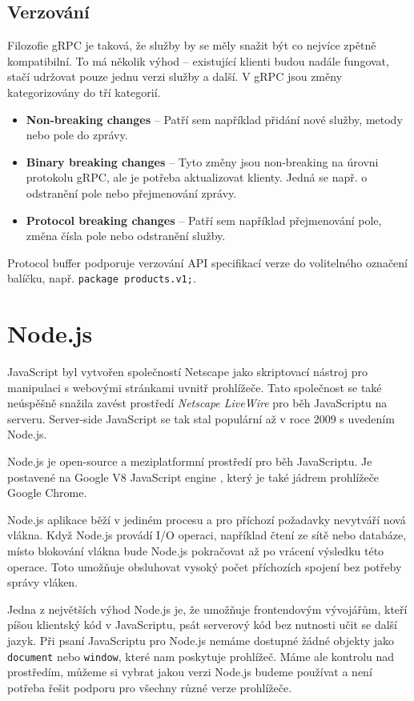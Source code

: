 \documentclass[thesis=M,czech]{FITthesis}[2019/12/23]
\begin{document}
\subsection{Verzování}
Filozofie gRPC je taková, že služby by se měly snažit být co nejvíce zpětně kompatibilní. To má několik výhod -- existující klienti budou nadále fungovat, stačí udržovat pouze jednu verzi služby a další. V gRPC jsou změny kategorizovány do tří kategorií.

\begin{itemize}
    \item \textbf{Non-breaking changes} -- Patří sem například přidání nové služby, metody nebo pole do zprávy.
    \item \textbf{Binary breaking changes} -- Tyto změny jsou non-breaking na úrovni protokolu gRPC, ale je potřeba aktualizovat klienty. Jedná se např. o odstranění pole nebo přejmenování zprávy.
    \item \textbf{Protocol breaking changes} -- Patří sem například přejmenování pole, změna čísla pole nebo odstranění služby.
\end{itemize}

Protocol buffer podporuje verzování API specifikací verze do volitelného označení balíčku, např. \texttt{package products.v1;}. 

\section{Node.js}
JavaScript byl vytvořen společností Netscape jako skriptovací nástroj pro manipulaci s webovými stránkami uvnitř prohlížeče. Tato společnost se také neúspěšně snažila zavést prostředí \textit{Netscape LiveWire} pro běh JavaScriptu na serveru. Server-side JavaScript se tak stal populární až v roce 2009 s uvedením Node.js.

Node.js \cite{node} je open-source a meziplatformní prostředí pro běh JavaScriptu. Je postavené na Google V8 JavaScript engine \cite{v8}, který je také jádrem prohlížeče Google Chrome.

Node.js aplikace běží v jediném procesu a pro příchozí požadavky nevytváří nová vlákna. Když Node.js provádí I/O operaci, například čtení ze sítě nebo databáze, místo blokování vlákna bude Node.js pokračovat až po vrácení výsledku této operace. Toto umožňuje obsluhovat vysoký počet příchozích spojení bez potřeby správy vláken.

Jedna z největších výhod Node.js je, že umožňuje frontendovým vývojářům, kteří píšou klientský kód v JavaScriptu, psát serverový kód bez nutnosti učit se další jazyk. 
Při psaní JavaScriptu pro Node.js nemáme dostupné žádné objekty jako \texttt{document} nebo \texttt{window}, které nam poskytuje prohlížeč. Máme ale kontrolu nad prostředím, můžeme si vybrat jakou verzi Node.js budeme používat a není potřeba řešit podporu pro všechny různé verze prohlížeče.
\end{document}
